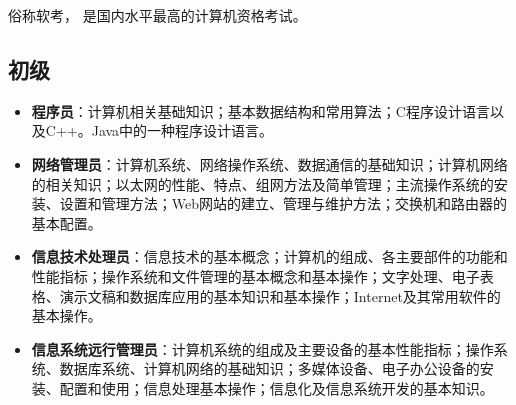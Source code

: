 
\begin{issues}
\issueDraft
\end{issues}

俗称软考， 是国内水平最高的计算机资格考试。

\subsection{初级}
\begin{itemize}
\item \textbf{程序员}：计算机相关基础知识；基本数据结构和常用算法；C程序设计语言以及C++。Java中的一种程序设计语言。
\item \textbf{网络管理员}：计算机系统、网络操作系统、数据通信的基础知识；计算机网络的相关知识；以太网的性能、特点、组网方法及简单管理；主流操作系统的安装、设置和管理方法；Web网站的建立、管理与维护方法；交换机和路由器的基本配置。
\item \textbf{信息技术处理员}：信息技术的基本概念；计算机的组成、各主要部件的功能和性能指标；操作系统和文件管理的基本概念和基本操作；文字处理、电子表格、演示文稿和数据库应用的基本知识和基本操作；Internet及其常用软件的基本操作。
\item \textbf{信息系统远行管理员}：计算机系统的组成及主要设备的基本性能指标；操作系统、数据库系统、计算机网络的基础知识；多媒体设备、电子办公设备的安装、配置和使用；信息处理基本操作；信息化及信息系统开发的基本知识。
\end{itemize}

